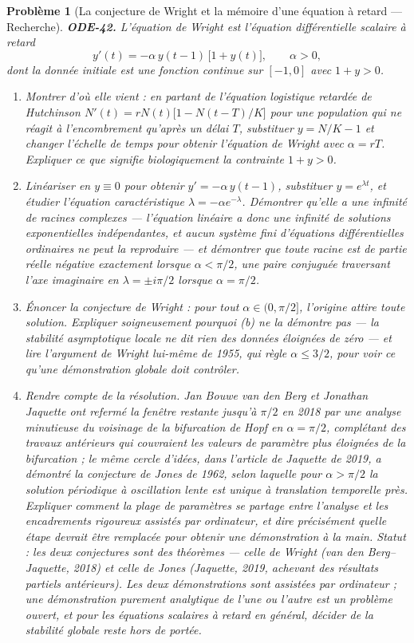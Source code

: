 \documentclass[11pt]{article}
\newtheorem{problem}{Problème}
\begin{document}
\begin{problem}[{La conjecture de Wright et la mémoire d'une équation à retard --- Recherche}]
\textbf{ODE-42.} L'équation de Wright est l'équation différentielle scalaire à retard
\[ y'(t) = -\alpha\, y(t-1)\,\bigl[ 1 + y(t) \bigr], \qquad \alpha > 0, \]
dont la donnée initiale est une fonction continue sur $ [-1, 0] $ avec $ 1 + y > 0 $.
\begin{enumerate}
\item[(a)] Montrer d'où elle vient : en partant de l'équation logistique retardée de Hutchinson
$ N'(t) = r N(t)\bigl[ 1 - N(t-T)/K \bigr] $ pour une population qui ne réagit à
l'encombrement qu'après un délai $ T $, substituer $ y = N/K - 1 $ et changer l'échelle de
temps pour obtenir l'équation de Wright avec $ \alpha = rT $. Expliquer ce que signifie
biologiquement la contrainte $ 1 + y > 0 $.
\item[(b)] Linéariser en $ y \equiv 0 $ pour obtenir $ y' = -\alpha\,y(t-1) $, substituer
$ y = e^{\lambda t} $, et étudier l'équation caractéristique $ \lambda = -\alpha e^{-\lambda} $.
Démontrer qu'elle a une infinité de racines complexes --- l'équation linéaire a donc une infinité de
solutions exponentielles indépendantes, et aucun système fini d'équations différentielles
ordinaires ne peut la reproduire --- et démontrer que toute racine est de partie réelle négative
exactement lorsque $ \alpha < \pi/2 $, une paire conjuguée traversant l'axe imaginaire en
$ \lambda = \pm i\pi/2 $ lorsque $ \alpha = \pi/2 $.
\item[(c)] Énoncer la conjecture de Wright : pour tout $ \alpha \in (0, \pi/2] $, l'origine attire
toute solution. Expliquer soigneusement pourquoi (b) ne la démontre pas --- la stabilité
asymptotique locale ne dit rien des données éloignées de zéro --- et lire l'argument de Wright
lui-même de 1955, qui règle $ \alpha \le 3/2 $, pour voir ce qu'une démonstration globale doit
contrôler.
\item[(d)] Rendre compte de la résolution. Jan Bouwe van den Berg et Jonathan Jaquette ont refermé la
fenêtre restante jusqu'à $ \pi/2 $ en 2018 par une analyse minutieuse du voisinage de la
bifurcation de Hopf en $ \alpha = \pi/2 $, complétant des travaux antérieurs qui couvraient les
valeurs de paramètre plus éloignées de la bifurcation ; le même cercle d'idées, dans l'article de
Jaquette de 2019, a démontré la conjecture de Jones de 1962, selon laquelle pour
$ \alpha > \pi/2 $ la solution périodique à oscillation lente est unique à translation
temporelle près. Expliquer comment la plage de paramètres se partage entre l'analyse et les
encadrements rigoureux assistés par ordinateur, et dire précisément quelle étape devrait être
remplacée pour obtenir une démonstration à la main.
\textit{Statut : les deux conjectures sont des théorèmes --- celle de Wright (van den Berg--Jaquette,
2018) et celle de Jones (Jaquette, 2019, achevant des résultats partiels antérieurs). Les deux
démonstrations sont assistées par ordinateur ; une démonstration purement analytique de l'une ou
l'autre est un problème ouvert, et pour les équations scalaires à retard en général, décider de la
stabilité globale reste hors de portée.}
\end{enumerate}


\end{problem}
\end{document}
